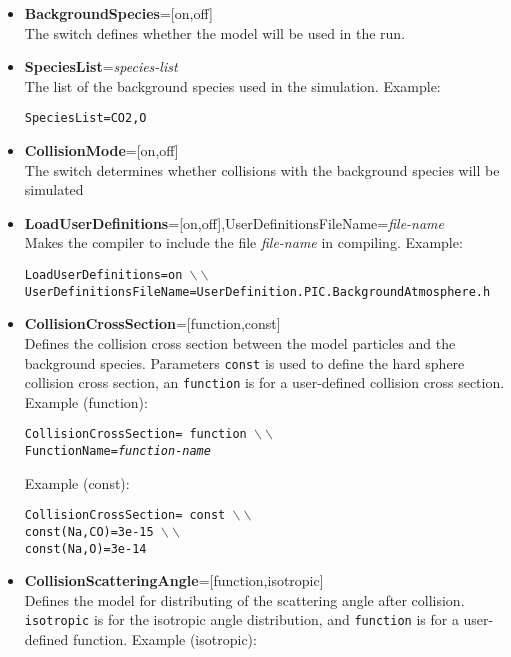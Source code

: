 \begin{itemize}

\item {\bf BackgroundSpecies}=[on,off] \\ The switch defines whether the model will be used in the run.  

\item {\bf SpeciesList}={\it species-list} \\ The list of the background species used in the simulation. Example: 

{\tt SpeciesList=CO2,O}

\item {\bf CollisionMode}=[on,off] \\ The switch determines whether collisions with the background species will be simulated

\item {\bf LoadUserDefinitions}=[on,off],UserDefinitionsFileName={\it file-name} \\ Makes the compiler to include the file {\it file-name} in compiling. Example:

{\tt LoadUserDefinitions=on $\backslash\backslash$ \\ UserDefinitionsFileName=UserDefinition.PIC.BackgroundAtmosphere.h}

\item {\bf CollisionCrossSection}=[function,const] \\ Defines the collision cross section between the model particles and the background species. Parameters {\tt const} is used to define the hard sphere collision cross section, an {\tt function} is for a user-defined collision cross section. Example (function):  

{\tt CollisionCrossSection= function $\backslash\backslash$ \\ FunctionName={\it function-name} }

Example (const):

{\tt CollisionCrossSection= const $\backslash\backslash$ \\     const(Na,CO)=3e-15 $\backslash\backslash$ \\ const(Na,O)=3e-14}

\item {\bf CollisionScatteringAngle}=[function,isotropic] \\ Defines the model for distributing of the scattering angle after collision. {\tt isotropic} is for the isotropic angle distribution, and {\tt function} is for a user-defined function. Example (isotropic): 


\end{itemize}
